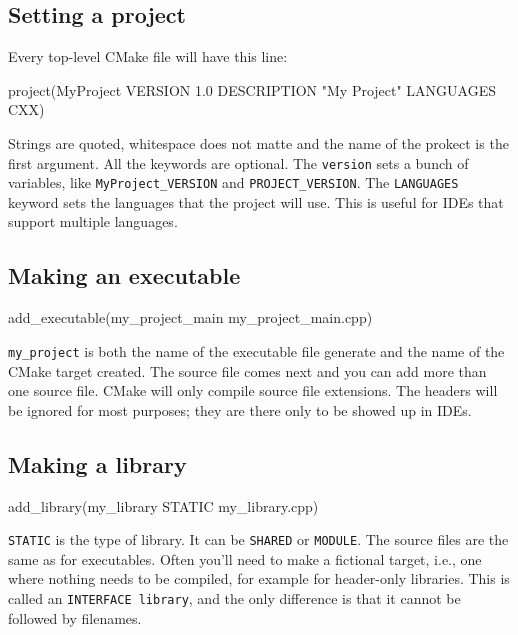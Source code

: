 \subsection{Setting a project}
Every top-level CMake file will have this line:
\begin{codeblock}[language=C++, numbers=none]
project(MyProject VERSION 1.0
    DESCRIPTION "My Project"
    LANGUAGES CXX)
\end{codeblock}

Strings are quoted, whitespace does not matte and the name of the prokect is the first argument.
All the keywords are optional. The \texttt{version} sets a bunch of variables, like \texttt{MyProject\_VERSION} 
and \texttt{PROJECT\_VERSION}. The \texttt{LANGUAGES} keyword sets the languages that the project will use. This is useful for IDEs that support multiple languages.

\subsection{Making an executable}

\begin{codeblock}[language=C++, numbers=none]
add_executable(my_project_main my_project_main.cpp)
\end{codeblock}

\texttt{my\_project} is both the name of the executable file generate and the name of the CMake target created.
The source file comes next and you can add more than one source file. CMake will only compile source file extensions. 
The headers will be ignored for most purposes; they are there only to be showed up in IDEs.

\subsection{Making a library}

\begin{codeblock}[language=C++, numbers=none]
add_library(my_library STATIC my_library.cpp)
\end{codeblock}

\texttt{STATIC} is the type of library. It can be \texttt{SHARED} or \texttt{MODULE}. The source files are the same as for executables.
Often you'll need to make a fictional target, i.e., one where nothing needs to be compiled, for example for header-only libraries. This is called an \texttt{INTERFACE library},
and the only difference is that it cannot be followed by filenames.

